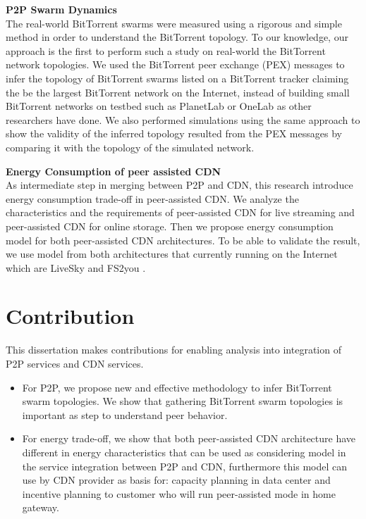 \textbf{P2P Swarm Dynamics}\\
The real-world BitTorrent swarms were measured using a rigorous and simple method in order to understand the BitTorrent topology. 
To our knowledge, our approach is the first to perform such a study on real-world the BitTorrent network topologies. 
We used the BitTorrent peer exchange (PEX) messages to infer the topology of BitTorrent swarms listed on a BitTorrent tracker claiming the be the largest BitTorrent network on the Internet, instead of building small BitTorrent networks on testbed such as PlanetLab or OneLab as other researchers have done.
We also performed simulations using the same approach to show the validity of the inferred topology resulted from the PEX messages by comparing it with the topology of the simulated network.

\textbf{Energy Consumption of peer assisted CDN}\\
As intermediate step in merging between P2P and CDN, this research introduce energy consumption trade-off in peer-assisted CDN. 
We analyze the characteristics and the requirements of peer-assisted CDN for live streaming and peer-assisted CDN for online storage.
Then we propose energy consumption model for both peer-assisted CDN architectures.
To be able to validate the result, we use model from both architectures that currently running on the Internet which are LiveSky \cite{Yin:2010:LEC:1823746.1823750} and FS2you \cite{fs2you}.
 


\section{Contribution}
This dissertation makes contributions for enabling analysis into integration of P2P services and CDN services.
\begin{itemize}
	\item For P2P, we propose new and effective methodology to infer BitTorrent swarm topologies. 
	We show that gathering BitTorrent swarm topologies is important as step to understand peer behavior. 
	\item For energy trade-off, we show that both peer-assisted CDN architecture have different in energy characteristics that can be used as considering model in the service integration between P2P and CDN, furthermore this model can use by CDN provider as basis for: capacity planning in data center and incentive planning to customer who will run peer-assisted mode in home gateway.
\end{itemize}
